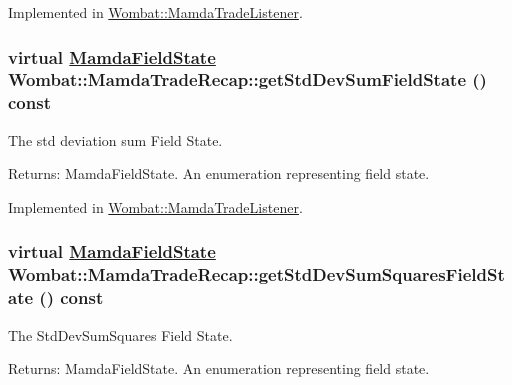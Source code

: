 Implemented in \hyperlink{classWombat_1_1MamdaTradeListener_dccc4da383c8a20f86ce59d774e55778}{Wombat::Mamda\-Trade\-Listener}.\hypertarget{classWombat_1_1MamdaTradeRecap_301b9d3bf67f823437080caa7dbd0804}{
\subsubsection[getStdDevSumFieldState]{\setlength{\rightskip}{0pt plus 5cm}virtual \hyperlink{namespaceWombat_93aac974f2ab713554fd12a1fa3b7d2a}{Mamda\-Field\-State} Wombat::Mamda\-Trade\-Recap::get\-Std\-Dev\-Sum\-Field\-State () const}}
\label{classWombat_1_1MamdaTradeRecap_301b9d3bf67f823437080caa7dbd0804}


The std deviation sum Field State. 

\begin{Desc}
\item[Returns:]Mamda\-Field\-State. An enumeration representing field state. \end{Desc}


Implemented in \hyperlink{classWombat_1_1MamdaTradeListener_2daad489d3cda802d7555b5f9edc0822}{Wombat::Mamda\-Trade\-Listener}.\hypertarget{classWombat_1_1MamdaTradeRecap_45483e8e818629de79c926ed89feaa9d}{
\subsubsection[getStdDevSumSquaresFieldState]{\setlength{\rightskip}{0pt plus 5cm}virtual \hyperlink{namespaceWombat_93aac974f2ab713554fd12a1fa3b7d2a}{Mamda\-Field\-State} Wombat::Mamda\-Trade\-Recap::get\-Std\-Dev\-Sum\-Squares\-Field\-State () const}}
\label{classWombat_1_1MamdaTradeRecap_45483e8e818629de79c926ed89feaa9d}


The Std\-Dev\-Sum\-Squares Field State. 

\begin{Desc}
\item[Returns:]Mamda\-Field\-State. An enumeration representing field state. \end{Desc}


